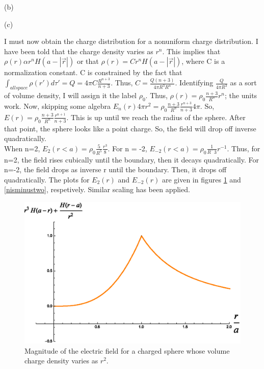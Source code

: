 \begin{homeworkProblem}
\begin{homeworkSection}{(b)}
\end{homeworkSection}

\begin{homeworkSection}{(c)}

I must now obtain the charge distribution for a nonuniform charge distribution. I have been told that the charge density varies as $r^n$. This implies that $\rho(r) \alpha r^n H(a-|\vec{r}|)$ or that $\rho(r) = C r^n H(a-|\vec{r}|)$, where C is a normalization constant. C is constrained by the fact that $\int_{all space} \rho(r')d\tau' = Q = 4\pi C \frac{R^{n+3}}{n+3}$. Thus, $C = \frac{Q (n+3)}{4\pi R^3 R^n}$. Identifying $\frac{Q}{4\pi R^3}$ as a sort of volume density, I will assign it the label $\rho_0$. Thus, $\rho(r) = \rho_0 \frac{n+3}{R^n} r^n$; the units work. Now, skipping some algebra $E_n(r) 4\pi r^2 = \rho_0 \frac{n+3}{R^n} \frac{r^{n+3}}{n+3} 4\pi$. So, $E(r) = \rho_0 \frac{n+3}{R^n} \frac{r^{n+1}}{n+3}$. This is up until we reach the radius of the sphere. After that point, the sphere looks like a point charge. So, the field will drop off inverse quadratically.
\\
When n=2, $E_2(r<a) =  \rho_0 \frac{5}{R^5} \frac{r^{3}}{8}$. For n = -2, $E_{-2}(r<a)=\rho_0 \frac{1}{R^-3} r^{-1}$. Thus, for n=2, the field rises cubically until the boundary, then it decays quadratically. For n=-2, the field drops as inverse r until the boundary. Then, it drops off quadratically. The plots for $E_2(r)$ and $E_{-2}(r)$ are given in figures \ref{nistwo} and \ref{nisminustwo}, respetively. Similar scaling has been applied.


\begin{figure}%
\centerline{\includegraphics[width=.75\columnwidth,height=.25\paperheight]{./Images/nsphereequalstwo.eps}}%
\caption{Magnitude of the electric field for a charged sphere whose volume charge density varies as $r^2$.}%
\label{nistwo}%
\end{figure}



\end{homeworkSection}
\end{homeworkProblem}
